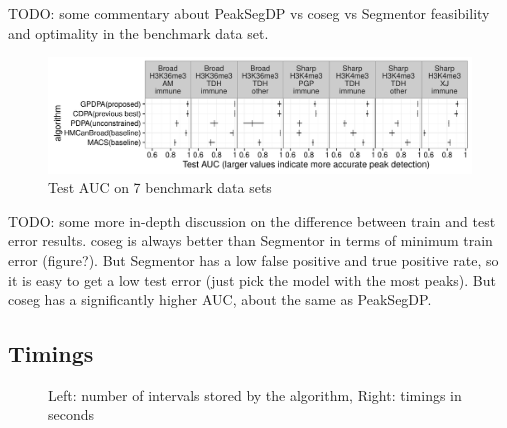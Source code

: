 \documentclass{article}
\begin{document}
TODO: some commentary about PeakSegDP vs coseg vs Segmentor
feasibility and optimality in the benchmark data set.

\begin{figure}[b!]
  \centering
  \includegraphics[width=\textwidth]{figure-test-error-dots}
  \caption{Test AUC on 7 benchmark data sets}
  \label{fig:test-error-dots}
\end{figure}

TODO: some more in-depth discussion on the difference between train
and test error results. coseg is always better than Segmentor in terms
of minimum train error (figure?). But Segmentor has a low false
positive and true positive rate, so it is easy to get a low test error
(just pick the model with the most peaks). But coseg has a
significantly higher AUC, about the same as PeakSegDP.

\subsection{Timings}

\begin{figure}[b!]
  \centering
  \parbox{0.49\textwidth}{
    
  }
  \parbox{0.49\textwidth}{
    
  }
  \caption{Left: number of intervals stored by the algorithm, Right: timings in seconds}
  \label{fig:timings}
\end{figure}



\end{document}
